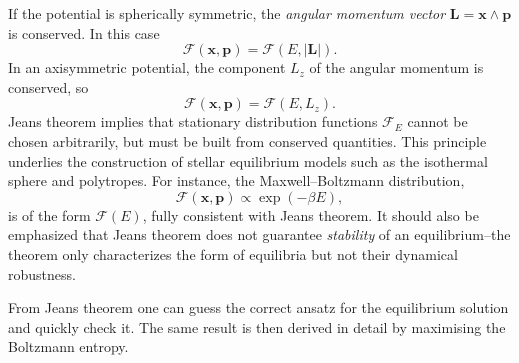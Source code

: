 \documentclass[12pt,a4paper]{article}
\numberwithin{equation}{section}
\begin{document}
If the potential is spherically symmetric, the \emph{angular momentum vector} $ \mathbf{L} = \mathbf{x} \wedge \bm{p}$ is conserved. In this case
\begin{equation}
\mathcal{F}(\mathbf{x},\bm{p}) = \mathcal{F}(E, |\mathbf{L}|).
\end{equation}
In an axisymmetric potential, the component $L_z$ of the angular momentum is conserved, so
\begin{equation}
\mathcal{F}(\mathbf{x},\bm{p}) = \mathcal{F}(E, L_z).
\end{equation}
Jeans theorem implies that stationary distribution functions $\mathcal{F}_{E}$ cannot be chosen arbitrarily, but must be built from conserved quantities. This principle underlies the construction of stellar equilibrium models such as the isothermal sphere and polytropes. For instance, the Maxwell--Boltzmann distribution,
\begin{equation}
\mathcal{F}(\mathbf{x},\bm{p}) \propto \exp(-\beta E),
\end{equation}
is of the form $\mathcal{F}(E)$, fully consistent with Jeans theorem. It should also be emphasized that Jeans theorem does not guarantee \emph{stability} of an equilibrium--the theorem only characterizes the form of equilibria but not their dynamical robustness.

From Jeans theorem one can guess the correct ansatz for the equilibrium solution and quickly check it. The same result is then derived in detail by maximising the Boltzmann entropy.
\end{document}
